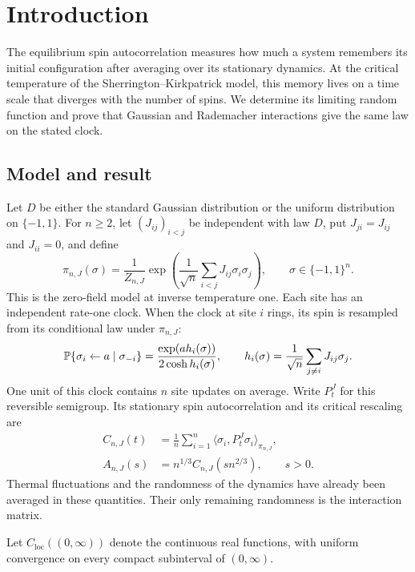\section{Introduction}\label{sec:introduction}

The equilibrium spin autocorrelation measures how much a system remembers
its initial configuration after averaging over its stationary dynamics.
At the critical temperature of the Sherrington--Kirkpatrick model, this
memory lives on a time scale that diverges with the number of spins.
We determine its limiting random function and prove that Gaussian and
Rademacher interactions give the same law on the stated clock.

\subsection{Model and result}
Let $D$ be either the standard Gaussian distribution or the uniform
distribution on $\{-1,1\}$. For $n\ge2$, let $(J_{ij})_{i<j}$ be independent
with law $D$, put $J_{ji}=J_{ij}$ and $J_{ii}=0$, and define
\begin{equation}\label{eq:intro-gibbs}
 \pi_{n,J}(\sigma)=\frac1{Z_{n,J}}
 \exp\left(\frac1{\sqrt n}\sum_{i<j}J_{ij}\sigma_i\sigma_j\right),
 \qquad \sigma\in\{-1,1\}^n.
\end{equation}
This is the zero-field model at inverse temperature one. Each site has an
independent rate-one clock. When the clock at site $i$ rings, its spin is
resampled from its conditional law under $\pi_{n,J}$:
\[
 \P\{\sigma_i\gets a\mid\sigma_{-i}\}
 =\frac{\exp(a h_i(\sigma))}{2\cosh h_i(\sigma)},
 \qquad h_i(\sigma)=\frac1{\sqrt n}\sum_{j\ne i}J_{ij}\sigma_j.
\]
One unit of this clock contains $n$ site updates on average.
Write $P_t^J$ for this reversible semigroup. Its stationary spin
autocorrelation and its critical rescaling are
\begin{align}
 C_{n,J}(t)&=\frac1n\sum_{i=1}^n
    \langle\sigma_i,P_t^J\sigma_i\rangle_{\pi_{n,J}},
       \label{eq:intro-correlation}\\
 A_{n,J}(s)&=n^{1/3}C_{n,J}(s n^{2/3}),\qquad s>0.
       \label{eq:intro-rescaling}
\end{align}
Thermal fluctuations and the randomness of the dynamics have already been
averaged in these quantities. Their only remaining randomness is the
interaction matrix.

Let $C_{\mathrm{loc}}((0,\infty))$ denote the continuous real functions,
with uniform convergence on every compact subinterval of $(0,\infty)$.

